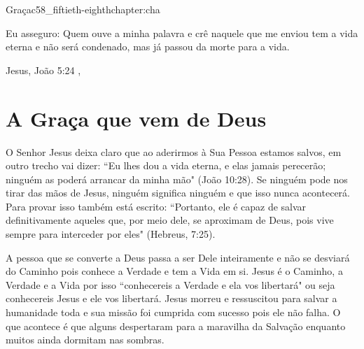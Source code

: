 \begin{chapterpage}{Graça}{c58_fiftieth-eighthchapter:cha}
 
\begin{myquotation}Eu asseguro: Quem ouve a minha palavra e crê naquele que me enviou tem a vida eterna e não será condenado, mas já passou da morte para a vida. 
\par\vspace*{15mm}
\mbox{}\hfill \emdash{}Jesus, João 5:24
, %
\par\end{myquotation}

\end{chapterpage}



\section{A Graça que vem de Deus}\label{c1_basicformatting:sec}

\emdash{}O Senhor Jesus deixa claro que ao aderirmos à Sua Pessoa estamos salvos, em outro trecho vai dizer: ``Eu lhes dou a vida eterna, e elas jamais perecerão; ninguém as poderá arrancar da minha mão" (João 10:28). Se ninguém pode nos tirar das mãos de Jesus, ninguém significa ninguém e que isso nunca acontecerá. Para provar isso também está escrito: ``Portanto, ele é capaz de salvar definitivamente aqueles que, por meio dele, se aproximam de Deus, pois vive sempre para interceder por eles" (Hebreus, 7:25).

\emdash{}A pessoa que se converte a Deus passa a ser Dele inteiramente e não se desviará do Caminho pois conhece a Verdade e tem a Vida em si. Jesus é o Caminho, a Verdade e a Vida por isso ``conhecereis a Verdade e ela vos libertará" ou seja conhecereis Jesus e ele vos libertará. Jesus morreu e ressuscitou para salvar a humanidade toda e sua missão foi cumprida com sucesso pois ele não falha. O que acontece é que alguns despertaram para a maravilha da Salvação enquanto muitos ainda dormitam nas sombras.

